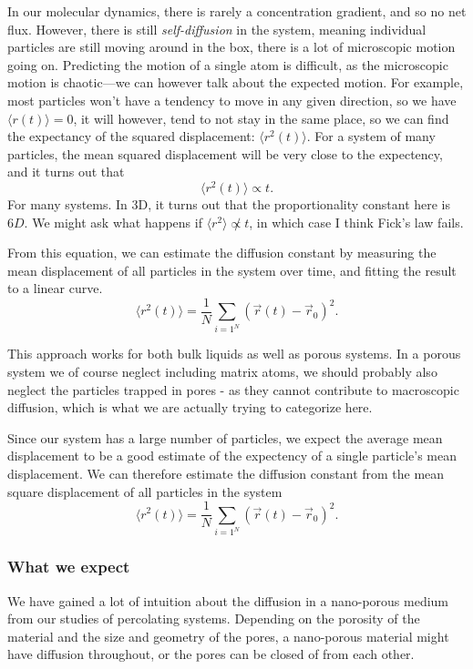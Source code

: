 \documentclass[a4paper, 11pt, notitlepage, english]{article}
\begin{document}
In our molecular dynamics, there is rarely a concentration gradient, and so no net flux. However, there is still \emph{self-diffusion} in the system, meaning individual particles are still moving around in the box, there is a lot of microscopic motion going on. Predicting the motion of a single atom is difficult, as the microscopic motion is chaotic---we can however talk about the expected motion. For example, most particles won't have a tendency to move in any given direction, so we have $\langle r(t) \rangle = 0$, it will however, tend to not stay in the same place, so we can find the expectancy of the squared displacement: $\langle r^2(t) \rangle$. For a system of many particles, the mean squared displacement will be very close to the expectency, and it turns out that
$$\langle r^2(t) \rangle \propto t.$$
For many systems. In 3D, it turns out that the proportionality constant here is $6D$. We might ask what happens if $\langle r^2 \rangle \not\propto t$, in which case I think Fick's law fails.

From this equation, we can estimate the diffusion constant by measuring the mean displacement of all particles in the system over time, and fitting the result to a linear curve.
$$\langle r^2(t) \rangle = \frac{1}{N}\sum_{i=1^N} (\vec{r}(t) - \vec{r}_{0})^2.$$

This approach works for both bulk liquids as well as porous systems. In a porous system we of course neglect including matrix atoms, we should probably also neglect the particles trapped in pores - as they cannot contribute to macroscopic diffusion, which is what we are actually trying to categorize here.

Since our system has a large number of particles, we expect the average mean displacement to be a good estimate of the expectency of a single particle's mean displacement. We can therefore estimate the diffusion constant from the mean square displacement of all particles in the system
$$\langle r^2(t) \rangle = \frac{1}{N}\sum_{i=1^N} (\vec{r}(t) - \vec{r}_{0})^2.$$

\subsubsection*{What we expect}

We have gained a lot of intuition about the diffusion in a nano-porous medium from our studies of percolating systems. Depending on the porosity of the material and the size and geometry of the pores, a nano-porous material might have diffusion throughout, or the pores can be closed of from each other.
\end{document}
